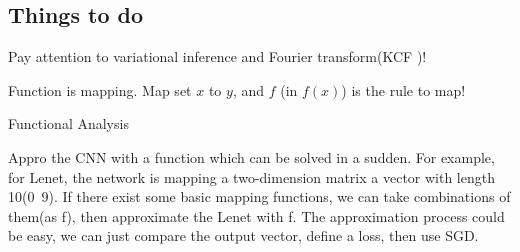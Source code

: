 \documentclass{article}
\begin{document}
\begin{spacing}{1.5}
\section{Things to do}
Pay attention to variational inference and Fourier transform(KCF )!

Function is mapping. Map set $x$ to $y$, and $f$ (in $f(x)$) is the rule to map!

Functional Analysis

Appro the CNN with a function which can be solved in a sudden. For example, for Lenet, the network is mapping a two-dimension matrix a vector with length 10(0~9). If there exist some basic mapping functions, we can take combinations of them(as f), then approximate the Lenet with f. The approximation process could be easy, we can just compare the output vector, define a loss, then use SGD.
\end{spacing}
\end{document}
